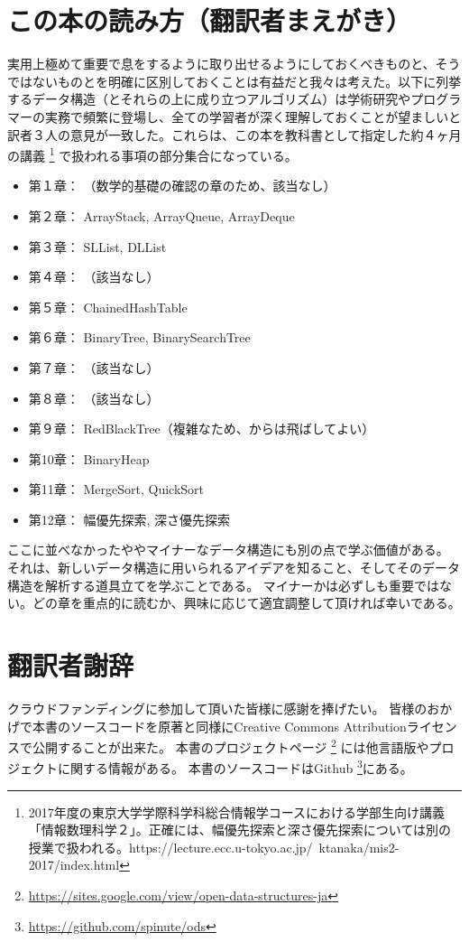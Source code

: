 \chapter*{この本の読み方（翻訳者まえがき）}

実用上極めて重要で息をするように取り出せるようにしておくべきものと、そうではないものとを明確に区別しておくことは有益だと我々は考えた。以下に列挙するデータ構造（とそれらの上に成り立つアルゴリズム）は学術研究やプログラマーの実務で頻繁に登場し、全ての学習者が深く理解しておくことが望ましいと訳者３人の意見が一致した。これらは、この本を教科書として指定した約４ヶ月の講義
\footnote{2017年度の東京大学学際科学科総合情報学コースにおける学部生向け講義「情報数理科学２」。正確には、幅優先探索と深さ優先探索については別の授業で扱われる。https://lecture.ecc.u-tokyo.ac.jp/~ktanaka/mis2-2017/index.html}
で扱われる事項の部分集合になっている。


\begin{itemize}
  \item 第１章： （数学的基礎の確認の章のため、該当なし）
  \item 第２章： ArrayStack, ArrayQueue, ArrayDeque
  \item 第３章： SLList, DLList
  \item 第４章： （該当なし）
  \item 第５章： ChainedHashTable
  \item 第６章： BinaryTree, BinarySearchTree
  \item 第７章： （該当なし）
  \item 第８章： （該当なし）
  \item 第９章： RedBlackTree（複雑なため、からは飛ばしてよい）
  \item 第10章： BinaryHeap
  \item 第11章： MergeSort, QuickSort
  \item 第12章： 幅優先探索, 深さ優先探索
\end{itemize}

ここに並べなかったややマイナーなデータ構造にも別の点で学ぶ価値がある。
それは、新しいデータ構造に用いられるアイデアを知ること、そしてそのデータ構造を解析する道具立てを学ぶことである。
マイナーかは必ずしも重要ではない。どの章を重点的に読むか、興味に応じて適宜調整して頂ければ幸いである。


\chapter*{翻訳者謝辞}
クラウドファンディングに参加して頂いた皆様に感謝を捧げたい。
皆様のおかげで本書のソースコードを原著と同様にCreative Commons Attributionライセンスで公開することが出来た。
本書のプロジェクトページ \footnote {\url{https://sites.google.com/view/open-data-structures-ja}} には他言語版やプロジェクトに関する情報がある。
本書のソースコードはGithub \footnote {\url{https://github.com/spinute/ods}}にある。
